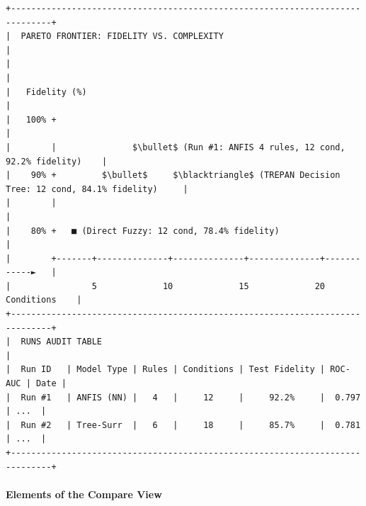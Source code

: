 \documentclass[10pt,a4paper]{article}
\begin{document}
\begin{verbatim}
+------------------------------------------------------------------------------+
|  PARETO FRONTIER: FIDELITY VS. COMPLEXITY                                    |
|                                                                              |
|   Fidelity (%)                                                               |
|   100% +                                                                     |
|        |               $\bullet$ (Run #1: ANFIS 4 rules, 12 cond, 92.2% fidelity)    |
|    90% +         $\bullet$     $\blacktriangle$ (TREPAN Decision Tree: 12 cond, 84.1% fidelity)     |
|        |                                                                     |
|    80% +   ■ (Direct Fuzzy: 12 cond, 78.4% fidelity)                         |
|        +-------+--------------+--------------+--------------+------------►   |
|                5             10             15             20  Conditions    |
+------------------------------------------------------------------------------+
|  RUNS AUDIT TABLE                                                            |
|  Run ID   | Model Type | Rules | Conditions | Test Fidelity | ROC-AUC | Date |
|  Run #1   | ANFIS (NN) |   4   |     12     |     92.2%     |  0.797  | ...  |
|  Run #2   | Tree-Surr  |   6   |     18     |     85.7%     |  0.781  | ...  |
+------------------------------------------------------------------------------+
\end{verbatim}

\paragraph{Elements of the Compare
View}\label{elements-of-the-compare-view}
\end{document}
